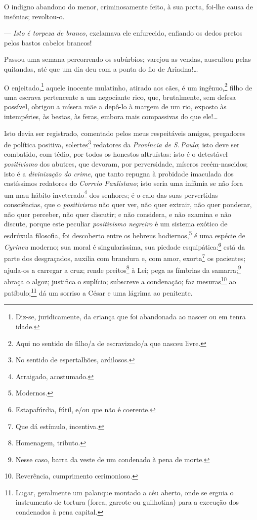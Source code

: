 O indigno abandono do menor, criminosamente feito, à sua porta, foi-lhe
causa de insônias; revoltou-o.

--- \emph{Isto é torpeza de branco}, exclamava ele enfurecido, enfiando
os dedos pretos pelos bastos cabelos brancos!

Passou uma semana percorrendo os subúrbios; varejou as vendas, auscultou
pelas quitandas, até que um dia deu com a ponta do fio de Ariadna!\ldots{}

O enjeitado,\footnote{Diz-se, juridicamente, da criança que foi
  abandonada ao nascer ou em tenra idade.} aquele inocente mulatinho,
atirado aos cães, é um ingênuo,\footnote{Aqui no sentido de filho/a de
  escravizado/a que nasceu livre.} filho de uma escrava pertencente a
um negociante rico, que, brutalmente, sem defesa possível, obrigou a
mísera mãe a depô-lo à margem de um rio, exposto às intempéries, às
bestas, às feras, embora mais compassivas do que ele!\ldots{}

Isto devia ser registrado, comentado pelos meus respeitáveis amigos,
pregadores de política positiva, solertes\footnote{No sentido de
  espertalhões, ardilosos.} redatores da \emph{Província de S.\,Paulo};
isto deve ser combatido, com tédio, por todos os honestos altruístas:
isto é o detestável \emph{positivismo} dos abutres, que devoram, por
perversidade, míseros recém-nascidos; isto é a \emph{divinização do
crime}, que tanto repugna à probidade imaculada dos castíssimos
redatores do \emph{Correio Paulistano}; isto seria uma infâmia se não
fora um mau hábito inveterado\footnote{Arraigado, acostumado.} dos
senhores; é o calo das suas pervertidas consciências, que o
\emph{positivismo} não quer ver, não quer extrair, não quer ponderar,
não quer perceber, não quer discutir; e não considera, e não examina e
não discute, porque este peculiar \emph{positivismo negreiro} é um
sistema exótico de esdrúxula filosofia, foi descoberto entre os hebreus
hodiernos,\footnote{Modernos.} é uma espécie de \emph{Cyrineu} 
moderno; sua moral é singularíssima, sua piedade esquipática:\footnote{
  Estapafúrdia, fútil, e/ou que não é coerente.} está da parte dos
desgraçados, auxilia com brandura e, com amor, exorta\footnote{Que dá
  estímulo, incentiva.} os pacientes; ajuda-os a carregar a cruz; rende
preitos\footnote{Homenagem, tributo.} à Lei; pega as fímbrias da
samarra;\footnote{Nesse caso, barra da veste de um condenado à pena de
  morte.} abraça o algoz; justifica o suplício; subscreve a condenação;
faz mesuras\footnote{Reverência, cumprimento cerimonioso.} ao
patíbulo;\footnote{Lugar, geralmente um palanque montado a céu aberto,
  onde se erguia o instrumento de tortura (forca, garrote ou guilhotina)
  para a execução dos condenados à pena capital.}
dá um sorriso a César e uma
lágrima ao penitente.

